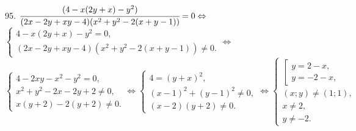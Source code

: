 95. $\cfrac{(4-x(2y+x)-y^2)}{(2x-2y+xy-4)(x^2+y^2-2(x+y-1))}=0\Leftrightarrow$\\$
\begin{cases}

4-x(2y+x)-y^2=0,\\
(2x-2y+xy-4)(x^2+y^2-2(x+y-1))\neq0.
\end{cases}\Leftrightarrow$\\$
\begin{cases}
4-2xy-x^2-y^2=0,\\
x^2+y^2-2x-2y+2\neq0,\\
x(y+2)-2(y+2)\neq0.
\end{cases}\Leftrightarrow
\begin{cases}
4=(y+x)^2,\\
(x-1)^2+(y-1)^2\neq0,\\
(x-2)(y+2)\neq0.
\end{cases}\Leftrightarrow
\begin{cases}
\left[\begin{array}{l}
y=2-x,\\
y=-2-x,
\end{array}\right.\\
(x;y)\neq (1;1),\\
x\neq2,\\
y\neq-2.
\end{cases}$
\begin{figure}[ht!]
\end{figure}
\newpage

